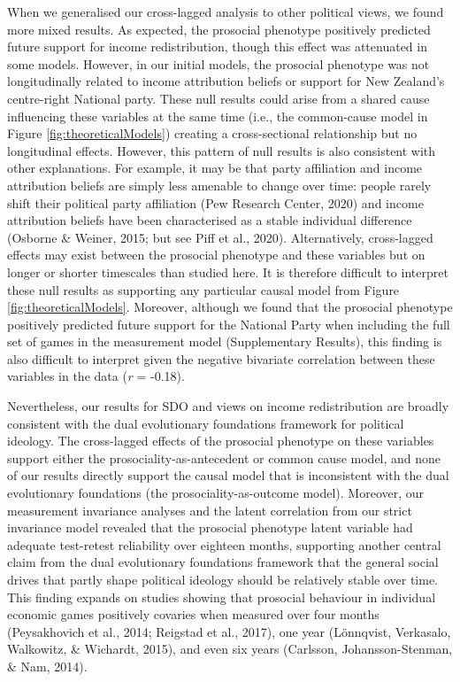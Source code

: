 \documentclass[
  man,floatsintext]{apa6}
\begin{document}
When we generalised our cross-lagged analysis to other political views, we found
more mixed results. As expected, the prosocial phenotype positively predicted
future support for income redistribution, though this effect was attenuated in
some models. However, in our initial models, the prosocial phenotype was not
longitudinally related to income attribution beliefs or support for New
Zealand's centre-right National party. These null results could arise from a
shared cause influencing these variables at the same time (i.e., the
common-cause model in Figure \ref{fig:theoreticalModels}) creating a
cross-sectional relationship but no longitudinal effects. However, this pattern
of null results is also consistent with other explanations. For example, it may
be that party affiliation and income attribution beliefs are simply less
amenable to change over time: people rarely shift their political party
affiliation (Pew Research Center, 2020) and income attribution beliefs have
been characterised as a stable individual difference (Osborne \& Weiner, 2015; but see Piff et al., 2020). Alternatively, cross-lagged effects may exist between the
prosocial phenotype and these variables but on longer or shorter timescales
than studied here. It is therefore difficult to interpret these null results
as supporting any particular causal model from Figure
\ref{fig:theoreticalModels}. Moreover, although we found that the prosocial
phenotype positively predicted future support for the National Party when
including the full set of games in the measurement model (Supplementary
Results), this finding is also difficult to interpret given the negative
bivariate correlation between these variables in the data (\emph{r} =
-0.18).

Nevertheless, our results for SDO and views on income redistribution are broadly
consistent with the dual evolutionary foundations framework for political
ideology. The cross-lagged effects of the prosocial phenotype on these
variables support either the prosociality-as-antecedent or common cause model,
and none of our results directly support the causal model that is inconsistent
with the dual evolutionary foundations (the prosociality-as-outcome model).
Moreover, our measurement invariance analyses and the latent correlation from
our strict invariance model revealed that the prosocial phenotype latent
variable had adequate test-retest reliability over eighteen months, supporting
another central claim from the dual evolutionary foundations framework that the
general social drives that partly shape political ideology should be relatively
stable over time. This finding expands on studies showing that prosocial
behaviour in individual economic games positively covaries when measured over
four months (Peysakhovich et al., 2014; Reigstad et al., 2017), one year (Lönnqvist, Verkasalo, Walkowitz, \& Wichardt, 2015), and
even six years (Carlsson, Johansson-Stenman, \& Nam, 2014).
\end{document}
